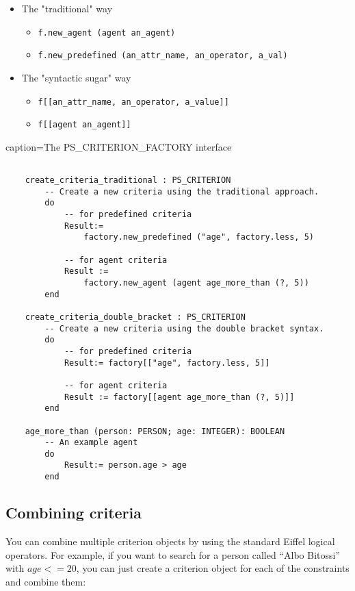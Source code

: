 \documentclass[a4paper,12pt]{report}
\begin{document}
 \begin{itemize}
  \item The "traditional" way
  \begin{itemize}
  \item \lstinline!f.new_agent (agent an_agent)!
  \item \lstinline!f.new_predefined (an_attr_name, an_operator, a_val)!
  \end{itemize}
  \item The "syntactic sugar" way
  \begin{itemize}
  \item \lstinline!f[[an_attr_name, an_operator, a_value]]!
  \item \lstinline!f[[agent an_agent]]!
  \end{itemize} 
  \end{itemize}
caption={The PS\_CRITERION\_FACTORY interface}
\begin{lstlisting}[language=OOSC2Eiffel, captionpos=b, caption={Different ways of creating criteria.}, label={lst:factory_usage}]

	create_criteria_traditional : PS_CRITERION
		-- Create a new criteria using the traditional approach.
		do
			-- for predefined criteria
			Result:= 
				factory.new_predefined ("age", factory.less, 5)

			-- for agent criteria
			Result := 
				factory.new_agent (agent age_more_than (?, 5))
		end

	create_criteria_double_bracket : PS_CRITERION
		-- Create a new criteria using the double bracket syntax.
		do
			-- for predefined criteria
			Result:= factory[["age", factory.less, 5]]

			-- for agent criteria
			Result := factory[[agent age_more_than (?, 5)]]
		end			

	age_more_than (person: PERSON; age: INTEGER): BOOLEAN
		-- An example agent
		do
			Result:= person.age > age
		end

\end{lstlisting}

\subsection{Combining criteria}

You can combine multiple criterion objects by using the standard Eiffel logical operators. 
For example, if you want to search for a person called ``Albo Bitossi'' with $age <= 20$, you can just create a criterion object for each of the constraints and combine them:  
\end{document}
